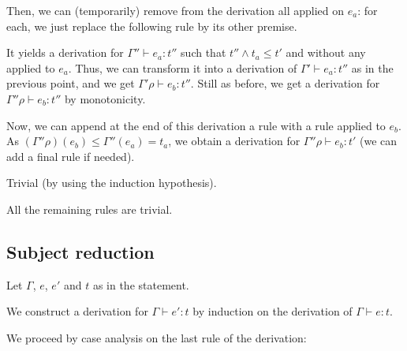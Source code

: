 \documentclass[a4paper]{article}
\theoremstyle{definition}
\begin{document}
\begin{description}
\begin{itemize}
            Then, we can (temporarily) remove from the derivation all  applied on $e_a$:
            for each, we just replace the following  rule by its other premise.

            It yields a derivation for $\Gamma'' \vdash e_a : t''$ such that $t''\land t_a \leq t'$ and without any  applied to $e_a$.
            Thus, we can transform it into a derivation of $\Gamma' \vdash e_a : t''$ as in the previous point, and we get $\Gamma'\rho \vdash e_b : t''$.
            Still as before, we get a derivation for $\Gamma''\rho\vdash e_b : t''$ by monotonicity.
            
            Now, we can append at the end of this derivation a rule  with a rule  applied to $e_b$.
            As $(\Gamma''\rho)(e_b) \leq \Gamma''(e_a) = t_a$, we obtain a derivation for $\Gamma''\rho\vdash e_b : t'$ (we can add a final  rule if needed).
          \end{itemize}
          
          \item[\Rule{PTypeof}] Trivial (by using the induction hypothesis).
          \item[\Rule{P$\cdots$}] All the remaining rules are trivial.
        \end{description}

        \subsection{Subject reduction}

        Let $\Gamma$, $e$, $e'$ and $t$ as in the statement.

        We construct a derivation for $\Gamma \vdash e':t$ by induction on the derivation of $\Gamma \vdash e:t$.

        We proceed by case analysis on the last rule of the derivation:
        
\end{document}
